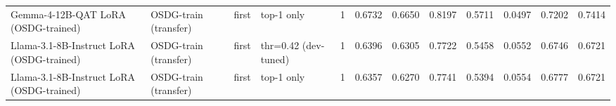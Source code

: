 \begin{tabular}{llllrlllllll}
Gemma-4-12B-QAT LoRA (OSDG-trained) & OSDG-train (transfer) & first & top-1 only & 1 & 0.6732 & 0.6650 & 0.8197 & 0.5711 & 0.0497 & 0.7202 & 0.7414 \\
Llama-3.1-8B-Instruct LoRA (OSDG-trained) & OSDG-train (transfer) & first & thr=0.42 (dev-tuned) & 1 & 0.6396 & 0.6305 & 0.7722 & 0.5458 & 0.0552 & 0.6746 & 0.6721 \\
Llama-3.1-8B-Instruct LoRA (OSDG-trained) & OSDG-train (transfer) & first & top-1 only & 1 & 0.6357 & 0.6270 & 0.7741 & 0.5394 & 0.0554 & 0.6777 & 0.6721 \\
\bottomrule
\end{tabular}
